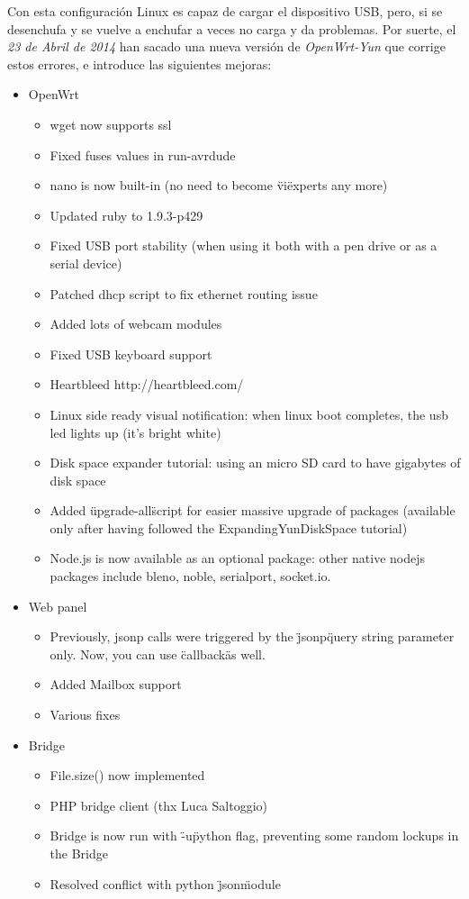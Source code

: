 Con esta configuración Linux es capaz de cargar el dispositivo USB, pero, si se desenchufa y se vuelve a enchufar a veces no carga y da problemas. Por suerte, el \emph{23 de Abril de 2014} han sacado una nueva versión de \emph{OpenWrt-Yun} que corrige estos errores, e introduce las siguientes mejoras:

	\begin{itemize}
		\item OpenWrt
			\begin{itemize}
 				\item wget now supports ssl
 				\item Fixed fuses values in run-avrdude
 				\item nano is now built-in (no need to become \"vi\" experts any more)
 				\item Updated ruby to 1.9.3-p429
 				\item Fixed USB port stability (when using it both with a pen drive or as a serial device)
 				\item Patched dhcp script to fix ethernet routing issue
 				\item Added lots of webcam modules
 				\item Fixed USB keyboard support
 				\item Heartbleed http://heartbleed.com/
 				\item Linux side ready visual notification: when linux boot completes, the usb led lights up (it's bright white)
 				\item Disk space expander tutorial: using an micro SD card to have gigabytes of disk space
 				\item Added \"upgrade-all\" script for easier massive upgrade of packages (available only after having followed the ExpandingYunDiskSpace tutorial)
 				\item Node.js is now available as an optional package: other native nodejs packages include bleno, noble, serialport, socket.io.
			\end{itemize}

		\item Web panel
			\begin{itemize}
				\item Previously, jsonp calls were triggered by the \"jsonp\" query string parameter only. Now, you can use \"callback\" as well.
				\item Added Mailbox support
				\item Various fixes
			\end{itemize}

		\item Bridge
			\begin{itemize}
				\item File.size() now implemented
				\item PHP bridge client (thx Luca Saltoggio)
				\item Bridge is now run with \"-u\" python flag, preventing some random lockups in the Bridge
				\item Resolved conflict with python \"json\" module
			\end{itemize}
	\end{itemize}


